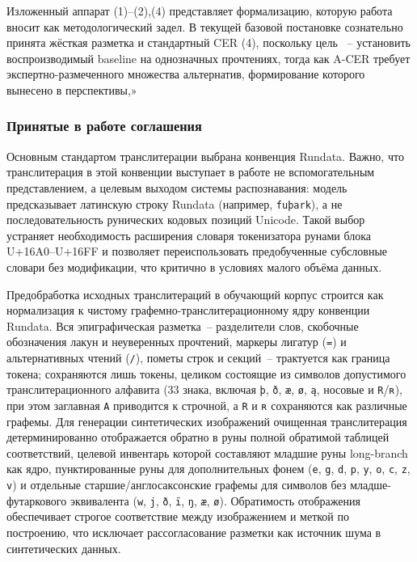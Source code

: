 \documentclass[a4paper,12pt]{extarticle}
\begin{document}
Изложенный аппарат (1)–(2),(4) представляет формализацию, которую работа вносит как методологический задел. В текущей базовой постановке сознательно принята жёсткая разметка и стандартный CER (4), поскольку цель ~-- установить воспроизводимый baseline на однозначных прочтениях, тогда как A-CER требует экспертно-размеченного множества альтернатив​, формирование которого вынесено в перспективы,»

\subsubsection{Принятые в работе соглашения}

Основным стандартом транслитерации выбрана конвенция Rundata. Важно, что транслитерация в этой конвенции выступает в работе не вспомогательным представлением, а целевым выходом системы распознавания: модель предсказывает латинскую строку Rundata (например, \texttt{fuþark}), а не последовательность рунических кодовых позиций Unicode. Такой выбор устраняет необходимость расширения словаря токенизатора рунами блока U+16A0--U+16FF и позволяет переиспользовать предобученные субсловные словари без модификации, что критично в условиях малого объёма данных. 

Предобработка исходных транслитераций в обучающий корпус строится как нормализация к чистому графемно-транслитерационному ядру конвенции Rundata. Вся эпиграфическая разметка~-- разделители слов, скобочные обозначения лакун и неуверенных прочтений, маркеры лигатур (\texttt{=}) и альтернативных чтений (\texttt{/}), пометы строк и секций~-- трактуется как граница токена; сохраняются лишь токены, целиком состоящие из символов допустимого транслитерационного алфавита (33 знака, включая \texttt{þ}, \texttt{ð}, \texttt{æ}, \texttt{ø}, \texttt{ą}, носовые и \texttt{R}/\texttt{ʀ}), при этом заглавная \texttt{A} приводится к строчной, а \texttt{R} и \texttt{ʀ} сохраняются как различные графемы. Для генерации синтетических изображений очищенная транслитерация детерминированно отображается обратно в руны полной обратимой таблицей соответствий, целевой инвентарь которой составляют младшие руны long-branch как ядро, пунктированные руны для дополнительных фонем (\texttt{e}, \texttt{g}, \texttt{d}, \texttt{p}, \texttt{y}, \texttt{o}, \texttt{c}, \texttt{z}, \texttt{v}) и отдельные старшие/англосаксонские графемы для символов без младше-футаркового эквивалента (\texttt{w}, \texttt{j}, \texttt{ð}, \texttt{ï}, \texttt{ŋ}, \texttt{æ}, \texttt{ø}). Обратимость отображения обеспечивает строгое соответствие между изображением и меткой по построению, что исключает рассогласование разметки как источник шума в синтетических данных.
\end{document}
